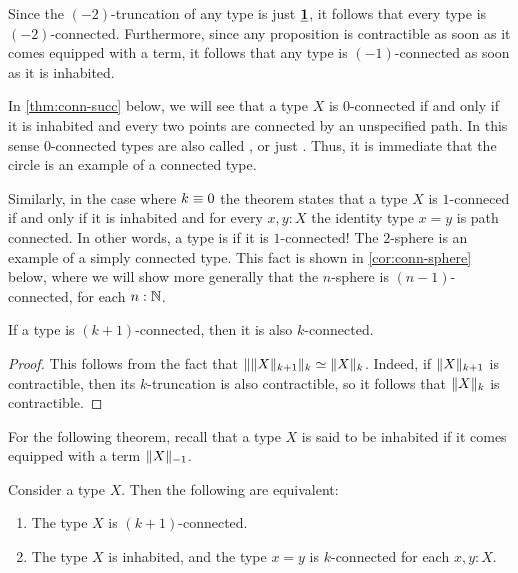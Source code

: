 \begin{rmk}
  Since the $(-2)$-truncation of any type is just $\unit$, it follows that every type is $(-2)$-connected. Furthermore, since any proposition is contractible as soon as it comes equipped with a term, it follows that any type is $(-1)$-connected as soon as it is inhabited.

    In \cref{thm:conn-succ} below, we will see that a type $X$ is $0$-connected if and only if it is inhabited and every two points are connected by an unspecified path. In this sense $0$-connected types are also called , or just . Thus, it is immediate that the circle is an example of a connected type.

  Similarly, in the case where $k\jdeq 0$ the theorem states that a type $X$ is $1$-conneced if and only if it is inhabited and for every $x,y:X$ the identity type $x=y$ is path connected. In other words, a type is  if it is $1$-connected! The $2$-sphere is an example of a simply connected type. This fact is shown in \cref{cor:conn-sphere} below, where we will show more generally that the $n$-sphere is $(n-1)$-connected, for each $n:\N$.
\end{rmk}

\begin{lem}
  If a type is $(k+1)$-connected, then it is also $k$-connected.
\end{lem}

\begin{proof}
  This follows from the fact that $\trunc{k}{\trunc{k+1}{X}}\simeq\trunc{k}{X}$. Indeed, if $\trunc{k+1}{X}$ is contractible, then its $k$-truncation is also contractible, so it follows that $\trunc{k}{X}$ is contractible.
\end{proof}

For the following theorem, recall that a type $X$ is said to be inhabited if it comes equipped with a term $\trunc{-1}{X}$.

\begin{thm}\label{thm:conn-succ}
  Consider a type $X$. Then the following are equivalent:
  \begin{enumerate}
  \item The type $X$ is $(k+1)$-connected.
  \item The type $X$ is inhabited, and the type $x=y$ is $k$-connected for each $x,y:X$.
  \end{enumerate}
\end{thm}

